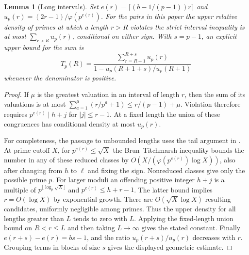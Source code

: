 \documentclass[11pt]{article}
\newtheorem{lemma}[theorem]{Lemma}
\begin{document}
\begin{lemma}[Long intervals]\label{lem:long}
Set $e(r)=\lceil(b-1/(p-1))r\rceil$ and $u_p(r)=(2r-1)/\varphi(p^{e(r)})$. For the pairs in this paper the upper relative density of primes at which a length $r>R$ violates the strict interval inequality is at most $\sum_{r>R}u_p(r)$, conditional on either sign. With $s=p-1$, an explicit upper bound for the sum is
\[
 T_p(R)=\frac{\sum_{r=R+1}^{R+s}u_p(r)}
                   {1-u_p(R+1+s)/u_p(R+1)}
\]
whenever the denominator is positive.
\end{lemma}
\begin{proof}
If $\mu$ is the greatest valuation in an interval of length $r$, then the sum of its valuations is at most $\sum_{a=1}^{\mu}(r/p^a+1)\le r/(p-1)+\mu$. Violation therefore requires $p^{e(r)}\mid h+j$ for $|j|\le r-1$. At a fixed length the union of these congruences has conditional density at most $u_p(r)$.

For completeness, the passage to unbounded lengths uses the tail argument in \cite{repo}. At prime cutoff $X$, for $p^{e(r)}\le\sqrt X$ the Brun--Titchmarsh inequality \cite{mv} bounds the number in any of these reduced classes by $O(X/(\varphi(p^{e(r)})\log X))$, also after changing from $h$ to $\ell$ and fixing the sign. Nonreduced classes give only the possible prime $p$. For larger moduli an offending positive integer $h+j$ is a multiple of $p^{\lfloor\log_p\sqrt X\rfloor}$ and $p^{e(r)}\le h+r-1$. The latter bound implies $r=O(\log X)$ by exponential growth. There are $O(\sqrt X\log X)$ resulting candidates, uniformly negligible among primes. Thus the upper density for all lengths greater than $L$ tends to zero with $L$. Applying the fixed-length union bound on $R<r\le L$ and then taking $L\to\infty$ gives the stated constant. Finally $e(r+s)-e(r)=bs-1$, and the ratio $u_p(r+s)/u_p(r)$ decreases with $r$. Grouping terms in blocks of size $s$ gives the displayed geometric estimate.
\end{proof}
\end{document}
